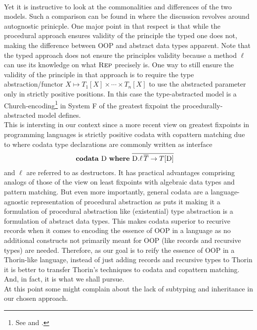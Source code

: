 \\
Yet it is instructive to look at the commonalities and differences of the two models.
Such a comparison can be found in \cite{cook} where the discussion revolves around {\glqq}autognostic prinicple{\grqq}.
One major point in that respect is that while the procedural approach ensures validity of the principle the typed one does not, making the difference between OOP and abstract data types apparent. Note that the typed approach does not ensure the principles validity because a method $\ell$ can use its knowledge on what $\textsc{Rep}$ precisely is.
One way to still ensure the validity of the principle in that approach is to require the type abstraction/functor $X \mapsto T_{1}[X] \times \cdots \times T_{n}[X]$ to use the abstracted parameter only in strictly positive positions.
In this case the type-abstracted model is a Church-encoding\footnote{See \cite{wadler} and \cite{gibbons}.} in System F of the greatest fixpoint the procedurally-abstracted model defines.
\\
This is intersting in our context since a more recent view on greatest fixpoints in programming languages is strictly positive codata with copattern matching due to \cite{abel} where codata type declarations are commonly written as interface
\begin{align*}
  &
  \mathbf{codata}\
  \textsc{D}\
  \mathbf{where}\
  \overline{\textsc{D}.\ell\,\overline{T} \to T[\textsc{D}]}
\end{align*}
and $\ell$ are referred to as destructors.
It has practical advantages comprising analogs of those of the view on least fixpoints with algebraic data types and pattern matching.
But even more importantly, general codata are a {\glqq}language-agnostic representation of procedural abstraction{\grqq} as \cite{codata in action} puts it making it a formulation of procedural abstraction like (existential) type abstraction is a formulation of abstract data types.
This makes codata superior to recurive records when it comes to encoding the essence of OOP in a language as no additional constructs not primarily meant for OOP (like records and recursive types) are needed.
Therefore, as our goal is to reify the essence of OOP in a Thorin-like language, instead of just adding records and recursive types to Thorin it is better to transfer Thorin's techniques to codata and copattern matching.
And, in fact, it is what we shall pursue.
\\
At this point some might complain about the lack of subtyping and inheritance in our chosen approach.
